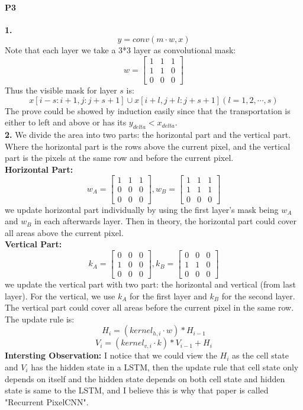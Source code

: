\documentclass[a4 paper,12pt]{article}
\theoremstyle{definitionstyle}
\begin{document}
\paragraph{P3}
\textbf{1.}
\[
    y=conv(m\cdot w,x)
\]
Note that each layer we take a 3*3 layer as convolutional mask:
\[
    w=\begin{bmatrix}
        1 & 1 & 1 \\
        1 & 1 & 0 \\
        0 & 0 & 0
    \end{bmatrix}
\]
Thus the visible mask for layer $s$ is:
\[
    x[i-s:i+1,j:j+s+1]\cup x[i+l,j+l:j+s+1](l=1,2,\cdots,s)
\]
The prove could be showed by induction easily since that the transportation is either to left and above or has its $y_{delta}<x_{delta}$.\\
\textbf{2.}
We divide the area into two parts: the horizontal part and the vertical part. Where the horizontal part is the rows above the current pixel, and the vertical part is the pixels at the same row and before the current pixel.\\
\textbf{Horizontal Part:}
\[
    w_A=\begin{bmatrix}
        1 & 1 & 1 \\
        0 & 0 & 0 \\
        0 & 0 & 0
    \end{bmatrix},
    w_B=\begin{bmatrix}
        1 & 1 & 1 \\
        1 & 1 & 1 \\
        0 & 0 & 0
    \end{bmatrix}
\]
we update horizontal part individually by using the first layer's mask being $w_A$ and $w_B$ in each afterwards layer. Then in theory, the horizontal part could cover all areas above the current pixel.\\
\textbf{Vertical Part:}
\[
    k_A=\begin{bmatrix}
        0 & 0 & 0 \\
        1 & 0 & 0 \\
        0 & 0 & 0
    \end{bmatrix},
    k_B=\begin{bmatrix}
        0 & 0 & 0 \\
        1 & 1 & 0 \\
        0 & 0 & 0
    \end{bmatrix}
\]
we update the vertical part with two part: the horizontal and vertical (from last layer). For the vertical, we use $k_A$ for the first layer and $k_B$ for the second layer. The vertical part could cover all areas before the current pixel in the same row.\\
The update rule is:
\[
    H_i=(kernel_{h,i}\cdot w)*H_{i-1}
\]
\[
    V_i=(kernel_{v,i}\cdot k)*V_{i-1}+H_i
\]
\textbf{Intersting Observation:} I notice that we could view the $H_i$ as the cell state and $V_i$ has the hidden state in a LSTM, then the update rule that cell state only depends on itself and the hidden state depends on both cell state and hidden state is same to the LSTM, and I believe this is why that paper is called "Recurrent PixelCNN".\\
\end{document}

